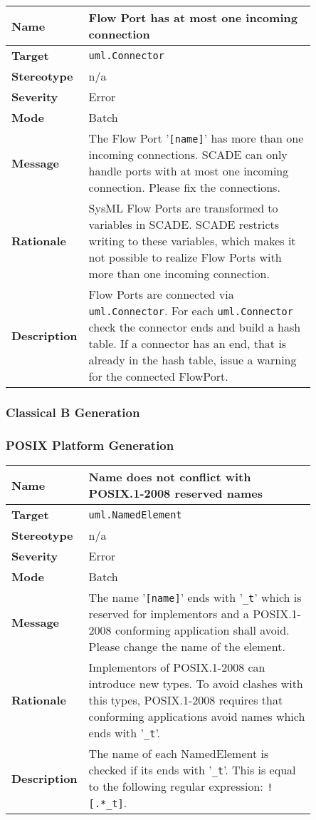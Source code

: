 \documentclass{template/openetcs_article}
\begin{document}
\begin{longtable}{|l||>{\raggedright}p{0.85\linewidth}|}
  \hline
  \textbf{Name}        &  Flow Port has at most one incoming connection \tabularnewline \hline
  \textbf{Target}      &  \texttt{uml.Connector} \tabularnewline \hline
  \textbf{Stereotype}  &  n/a \tabularnewline \hline
  \textbf{Severity}    &  Error \tabularnewline \hline
  \textbf{Mode}        &  Batch \tabularnewline \hline
  \textbf{Message}     &  The Flow Port '\texttt{[name]}' has more than one incoming connections. SCADE can only handle 
                          ports with at most one incoming connection. Please fix the connections. \tabularnewline \hline
  \textbf{Rationale}   &  SysML Flow Ports are transformed to variables in SCADE. SCADE restricts writing to these 
                          variables, which makes it not possible to realize Flow Ports with more than one incoming
                          connection. \tabularnewline \hline
  \textbf{Description} &  Flow Ports are connected via \texttt{uml.Connector}. For each \texttt{uml.Connector} check the 
                          connector ends and build a hash table. If a connector has an end, that is 
                          already in the hash table, issue a warning for the connected FlowPort.
                          \tabularnewline \hline
\end{longtable}

\subsubsection{Classical B Generation}

\subsubsection{POSIX Platform Generation}

\begin{longtable}{|l||>{\raggedright}p{0.85\linewidth}|}
  \hline
  \textbf{Name}        &  Name does not conflict with POSIX.1-2008 reserved names \tabularnewline \hline
  \textbf{Target}      &  \texttt{uml.NamedElement} \tabularnewline \hline
  \textbf{Stereotype}  &  n/a \tabularnewline \hline
  \textbf{Severity}    &  Error \tabularnewline \hline
  \textbf{Mode}        &  Batch \tabularnewline \hline
  \textbf{Message}     &  The name '\texttt{[name]}' ends with '\texttt{\_t}' which is reserved for
                          implementors and a POSIX.1-2008 conforming application shall avoid. 
                          Please change the name of the element. \tabularnewline \hline
  \textbf{Rationale}   &  Implementors of POSIX.1-2008 can introduce new types. To avoid clashes with this types,
                          POSIX.1-2008 requires that conforming applications avoid names which 
                          ends with '\texttt{\_t}'. \tabularnewline \hline
  \textbf{Description} &  The name of each NamedElement is checked if its ends with '\texttt{\_t}'. This is equal to 
                          the following regular expression: \texttt{![.*\_t]}. \tabularnewline \hline
\end{longtable}



% 
% 

\end{document}
